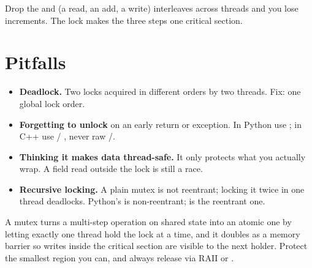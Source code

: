 \documentclass[11pt]{article}
\begin{document}
Drop the  and  (a read, an add, a write) interleaves across threads and you lose increments. The lock makes the three steps one critical section.


\section{Pitfalls}

\begin{itemize}[nosep]
  \item \textbf{Deadlock.} Two locks acquired in different orders by two threads. Fix: one global lock order.
  \item \textbf{Forgetting to unlock} on an early return or exception. In Python use ; in C++ use  / , never raw /.
  \item \textbf{Thinking it makes data thread-safe.} It only protects what you actually wrap. A field read outside the lock is still a race.
  \item \textbf{Recursive locking.} A plain mutex is not reentrant; locking it twice in one thread deadlocks. Python's  is non-reentrant;  is the reentrant one.
\end{itemize}

\begin{keypoint}
A mutex turns a multi-step operation on shared state into an atomic one by letting exactly one thread hold the lock at a time, and it doubles as a memory barrier so writes inside the critical section are visible to the next holder. Protect the smallest region you can, and always release via RAII or .
\end{keypoint}
\end{document}
